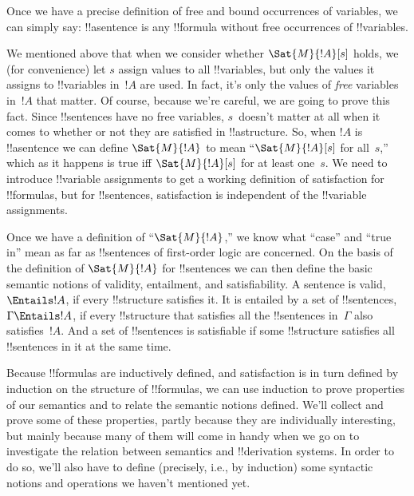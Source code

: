 Once we have a precise definition of free and bound occurrences of
variables, we can simply say: !!a{sentence} is any !!{formula} without
free occurrences of !!{variable}s.







We mentioned above that when we consider whether $\Sat{M}{!A}[s]$
holds, we (for convenience) let $s$ assign values to all !!{variable}s,
but only the values it assigns to !!{variable}s in~$!A$ are used.  In
fact, it's only the values of \emph{free} variables in~$!A$ that
matter. Of course, because we're careful, we are going to prove this
fact. Since !!{sentence}s have no free variables, $s$~doesn't matter
at all when it comes to whether or not they are satisfied in
!!a{structure}.  So, when $!A$ is !!a{sentence} we can define
$\Sat{M}{!A}$ to mean ``$\Sat{M}{!A}[s]$ for all~$s$,'' which as it
happens is true iff $\Sat{M}{!A}[s]$ for at least one~$s$. We need to
introduce !!{variable} assignments to get a working definition of
satisfaction for !!{formula}s, but for !!{sentence}s, satisfaction is
independent of the !!{variable} assignments.

Once we have a definition of ``$\Sat{M}{!A}$,'' we know what ``case''
and ``true in'' mean as far as !!{sentence}s of first-order logic are
concerned. On the basis of the definition of $\Sat{M}{!A}$ for
!!{sentence}s we can then define the basic semantic notions of
validity, entailment, and satisfiability.  A sentence is valid,
$\Entails !A$, if every !!{structure} satisfies it. It is entailed by
a set of !!{sentence}s, $\Gamma \Entails !A$, if every !!{structure}
that satisfies all the !!{sentence}s in~$\Gamma$ also satisfies~$!A$.
And a set of !!{sentence}s is satisfiable if some !!{structure}
satisfies all !!{sentence}s in it at the same time.

Because !!{formula}s are inductively defined, and satisfaction is in
turn defined by induction on the structure of !!{formula}s, we can use
induction to prove properties of our semantics and to relate the
semantic notions defined.  We'll collect and prove some of these
properties, partly because they are individually interesting, but
mainly because many of them will come in handy when we go on to
investigate the relation between semantics and !!{derivation} systems. In order
to do so, we'll also have to define (precisely, i.e., by induction)
some syntactic notions and operations we haven't mentioned yet.





